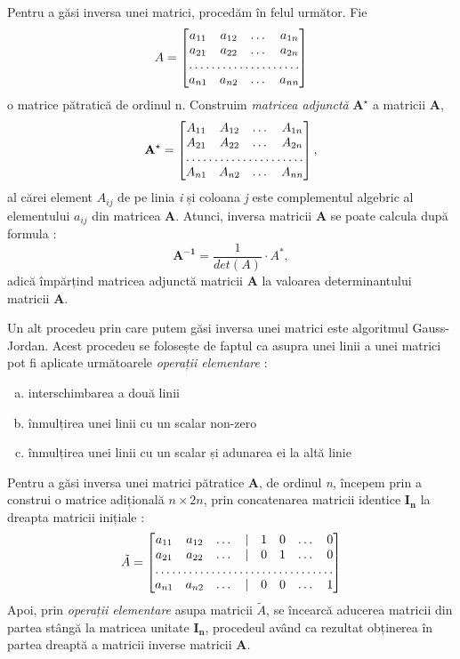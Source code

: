 Pentru a găsi inversa unei matrici, procedăm în felul următor.
Fie
\[
A = 
\begin{bmatrix}
a_{11} & a_{12} & \dots & a_{1n} \\
a_{21} & a_{22} & \dots & a_{2n} \\
\hdotsfor{4} \\
a_{n1} & a_{n2} & \dots & a_{nn}
\end{bmatrix}
\] o matrice pătratică de ordinul n. Construim \textit{matricea adjunctă}
$\mathbf{A^\star}$ a matricii \textbf{A},
\begin{equation*}
\mathbf{A^\star} = 
\begin{bmatrix}
A_{11} & A_{12} & \dots & A_{1n} \\
A_{21} & A_{22} & \dots & A_{2n} \\
\hdotsfor{4} \\
A_{n1} & A_{n2} & \dots & A_{nn}
\end{bmatrix},
\end{equation*} al cărei element $\mathit{A_{ij}}$ de pe linia \textit{i} și
coloana \textit{j} este complementul algebric al elementului $\mathit{a_{ij}}$
din matricea \textbf{A}.
Atunci, inversa matricii \textbf{A} se poate calcula după formula :
\begin{equation}
\label{mat:matrix_inverse}
\mathbf{A^{-1}} = \frac{1}{det(A)} \cdot A^{*},
\end{equation} adică împărțind matricea adjunctă matricii \textbf{A} la
valoarea determinantului matricii \textbf{A}.

Un alt procedeu prin care putem găsi inversa unei matrici este algoritmul
Gauss-Jordan. Acest procedeu se folosește de faptul ca asupra unei linii a unei
matrici pot fi aplicate următoarele \textit{operații elementare} :
\begin{enumerate}[(a)]
  \item interschimbarea a două linii
  \item înmulțirea unei linii cu un scalar non-zero
  \item înmulțirea unei linii cu un scalar și adunarea ei la altă linie
  \end{enumerate}
Pentru a găsi inversa unei matrici pătratice \textbf{A}, de ordinul \textit{n},
începem prin a construi o matrice adițională $n \times 2n$, prin concatenarea 
matricii identice $\mathbf{I_{n}}$ la dreapta matricii inițiale :
\begin{equation}
\label{eq:augm_matrix}
\tilde{A} = 
\begin{bmatrix}
a_{11} & a_{12} & \dots & \vert & 1 & 0 & \dots & 0 \\
a_{21} & a_{22} & \dots & \vert & 0 & 1 & \dots & 0 \\
\hdotsfor{8} \\
a_{n1} & a_{n2} & \dots & \vert & 0 & 0 & \dots & 1
\end{bmatrix}
\end{equation}
Apoi, prin \textit{operații elementare} asupa matricii $\tilde{A}$, se încearcă
aducerea matricii din partea stângă la matricea unitate $\mathbf{I_{n}}$,
procedeul având ca rezultat obținerea în partea dreaptă a matricii inverse
matricii \textbf{A}.

